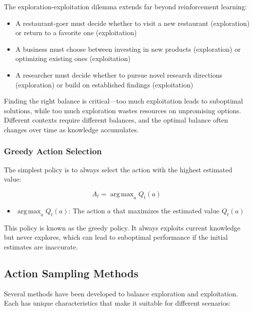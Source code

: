 \documentclass{article}
\DeclareMathOperator*{\argmax}{arg\,max}
\begin{document}
The exploration-exploitation dilemma extends far beyond reinforcement learning:

\begin{itemize}
    \item A restaurant-goer must decide whether to visit a new restaurant (exploration) or return to a favorite one (exploitation)
    \item A business must choose between investing in new products (exploration) or optimizing existing ones (exploitation)
    \item A researcher must decide whether to pursue novel research directions (exploration) or build on established findings (exploitation)
\end{itemize}

Finding the right balance is critical—too much exploitation leads to suboptimal solutions, while too much exploration wastes resources on unpromising options. Different contexts require different balances, and the optimal balance often changes over time as knowledge accumulates.

\subsubsection{Greedy Action Selection}
The simplest policy is to always select the action with the highest estimated value:

\begin{equation}
    A_t = \argmax_a Q_t(a)
\end{equation}

\begin{tcolorbox}[colback=blue!5!white,colframe=blue!75!black,title=Notation Overview]
\begin{itemize}
    \item $\argmax_a Q_t(a)$: The action $a$ that maximizes the estimated value $Q_t(a)$
\end{itemize}
\end{tcolorbox}

This policy is known as the greedy policy. It always exploits current knowledge but never explores, which can lead to suboptimal performance if the initial estimates are inaccurate.

\subsection{Action Sampling Methods}
Several methods have been developed to balance exploration and exploitation. Each has unique characteristics that make it suitable for different scenarios:
\end{document}
